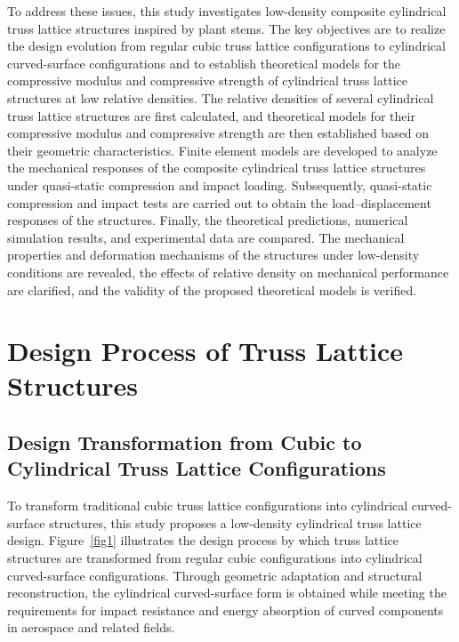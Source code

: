 \documentclass[12pt,a4paper]{article}
\begin{document}
	To address these issues, this study investigates low-density composite cylindrical truss lattice structures inspired by plant stems. The key objectives are to realize the design evolution from regular cubic truss lattice configurations to cylindrical curved-surface configurations and to establish theoretical models for the compressive modulus and compressive strength of cylindrical truss lattice structures at low relative densities. The relative densities of several cylindrical truss lattice structures are first calculated, and theoretical models for their compressive modulus and compressive strength are then established based on their geometric characteristics. Finite element models are developed to analyze the mechanical responses of the composite cylindrical truss lattice structures under quasi-static compression and impact loading. Subsequently, quasi-static compression and impact tests are carried out to obtain the load--displacement responses of the structures. Finally, the theoretical predictions, numerical simulation results, and experimental data are compared. The mechanical properties and deformation mechanisms of the structures under low-density conditions are revealed, the effects of relative density on mechanical performance are clarified, and the validity of the proposed theoretical models is verified.
	
	
	\section{Design Process of Truss Lattice Structures}
	
	\subsection{Design Transformation from Cubic to Cylindrical Truss Lattice Configurations}
	
	To transform traditional cubic truss lattice configurations into cylindrical curved-surface structures, this study proposes a low-density cylindrical truss lattice design. Figure~\ref{fig1} illustrates the design process by which truss lattice structures are transformed from regular cubic configurations into cylindrical curved-surface configurations. Through geometric adaptation and structural reconstruction, the cylindrical curved-surface form is obtained while meeting the requirements for impact resistance and energy absorption of curved components in aerospace and related fields.
	
\end{document}
